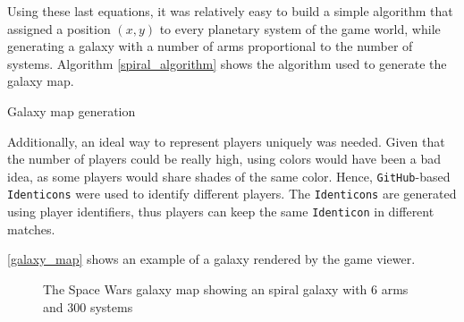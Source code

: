 \documentclass[a4paper,11pt,titlepage,abstract,numbers=noenddot,automark,mnsy,intlimits,rgb,dvipsnames]{report}
\begin{document}
Using these last equations, it was relatively easy to build a simple algorithm that assigned a position $(x, y)$ to every
planetary system of the game world, while generating a galaxy with a number of arms proportional to the number of systems.
Algorithm \autoref{spiral_algorithm} shows the algorithm used to generate the galaxy map.
\begin{algorithm}[H]
\caption{Galaxy map generation}
\label{spiral_algorithm}
\begin{algorithmic}
\ENDIF
\ENDFOR
\end{algorithmic}
\end{algorithm}
Additionally, an ideal way to represent players uniquely was needed. Given that the number
of players could be really high, using colors would have been a bad idea, as some players would share shades of the same
color. Hence, \texttt{GitHub}-based \texttt{Identicons} \cite{identicons} were used to identify different players. The \texttt{Identicons} are
generated using player identifiers, thus players can keep the same \texttt{Identicon} in different matches.

\autoref{galaxy_map} shows an example of a galaxy rendered by the game viewer.
\begin{figure}[H]
\begin{center}
\noindent{}
\end{center}
\caption{The Space Wars galaxy map showing an spiral galaxy with 6 arms and 300 systems}
\label{galaxy_map}
\end{figure}
\end{document}
